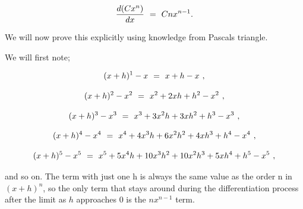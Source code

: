 \documentclass{article}
\begin{document}
\begin{equation} \label{eq:314}
\frac{d(C x^n)}{dx} \hspace{0.125cm} = \hspace{0.125cm} C n x^{n-1}.
\end{equation}

We will now prove this explicitly using knowledge from Pascals triangle. 

We will first note;

\begin{equation} \label{eq:315}
(x + h)^1  - x \hspace{0.125cm} = \hspace{0.125cm} x + h - x \hspace{0.125cm} ,
\end{equation}

\begin{equation} \label{eq:316}
(x + h)^2 - x^2 \hspace{0.125cm} = \hspace{0.125cm} x^2 + 2xh + h^2 - x^2 \hspace{0.125cm} ,
\end{equation}

\begin{equation} \label{eq:317}
(x + h)^3 - x^3 \hspace{0.125cm} = \hspace{0.125cm} x^3 + 3x^2 h + 3x h^2 + h^3 - x^3 \hspace{0.125cm} ,
\end{equation}

\begin{equation} \label{eq:318}
(x + h)^4 - x^4 \hspace{0.125cm} = \hspace{0.125cm} x^4 + 4x^3 h + 6x^2 h^2 + 4xh^3 + h^4 - x^4 \hspace{0.125cm} ,
\end{equation}

\begin{equation} \label{eq:319}
(x + h)^5 - x^5 \hspace{0.125cm} = \hspace{0.125cm} x^5 + 5x^4 h + 10x^3 h^2 + 10x^2 h^3 + 5xh^4 + h^5 - x^5 \hspace{0.125cm} ,
\end{equation}

and so on. The term with just one h is always the same value as the order n in \begin{math} (x + h)^n \end{math}, so the only term that stays around during the differentiation process after the limit as \begin{math} h \end{math} approaches \begin{math} 0 \end{math} is the \begin{math} n x^{n - 1} \end{math} term. 
\end{document}
